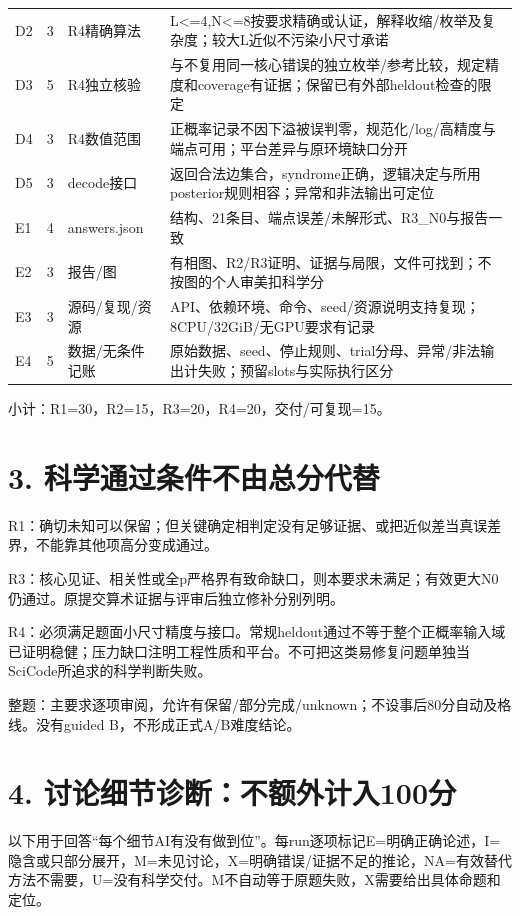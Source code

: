 \documentclass[11pt,a4paper]{article}
\begin{document}
{\begin{longtable}
{}D2 & 3 & R4精确算法 & L<=4,N<=8按要求精确或认证，解释收缩/枚举及复杂度；较大L近似不污染小尺寸承诺\tabularnewline
{}D3 & 5 & R4独立核验 & 与不复用同一核心错误的独立枚举/参考比较，规定精度和coverage有证据；保留已有外部heldout检查的限定\tabularnewline
{}D4 & 3 & R4数值范围 & 正概率记录不因下溢被误判零，规范化/log/高精度与端点可用；平台差异与原环境缺口分开\tabularnewline
{}D5 & 3 & decode接口 & 返回合法边集合，syndrome正确，逻辑决定与所用posterior规则相容；异常和非法输出可定位\tabularnewline
{}E1 & 4 & answers.json & 结构、21条目、端点误差/未解形式、R3\_N0与报告一致\tabularnewline
{}E2 & 3 & 报告/图 & 有相图、R2/R3证明、证据与局限，文件可找到；不按图的个人审美扣科学分\tabularnewline
{}E3 & 3 & 源码/复现/资源 & API、依赖环境、命令、seed/资源说明支持复现；8CPU/32GiB/无GPU要求有记录\tabularnewline
{}E4 & 5 & 数据/无条件记账 & 原始数据、seed、停止规则、trial分母、异常/非法输出计失败；预留slots与实际执行区分\tabularnewline
\bottomrule
\end{longtable}
}

小计：R1=30，R2=15，R3=20，R4=20，交付/可复现=15。

\section*{3. 科学通过条件不由总分代替}

R1：确切未知可以保留；但关键确定相判定没有足够证据、或把近似差当真误差界，不能靠其他项高分变成通过。

R3：核心见证、相关性或全p严格界有致命缺口，则本要求未满足；有效更大N0仍通过。原提交算术证据与评审后独立修补分别列明。

R4：必须满足题面小尺寸精度与接口。常规heldout通过不等于整个正概率输入域已证明稳健；压力缺口注明工程性质和平台。不可把这类易修复问题单独当SciCode所追求的科学判断失败。

整题：主要求逐项审阅，允许有保留/部分完成/unknown；不设事后80分自动及格线。没有guided B，不形成正式A/B难度结论。

\section*{4. 讨论细节诊断：不额外计入100分}

以下用于回答“每个细节AI有没有做到位”。每run逐项标记E=明确正确论述，I=隐含或只部分展开，M=未见讨论，X=明确错误/证据不足的推论，NA=有效替代方法不需要，U=没有科学交付。M不自动等于原题失败，X需要给出具体命题和定位。
\end{document}
